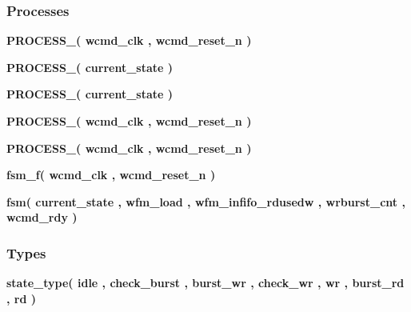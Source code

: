 \subsubsection*{Processes}
 \begin{DoxyCompactItemize}
\item 
{\bf P\+R\+O\+C\+E\+S\+S\+\_}{\bfseries  ( {\bfseries {\bfseries {\bf wcmd\+\_\+clk}} \textcolor{vhdlchar}{ }} , {\bfseries {\bfseries {\bf wcmd\+\_\+reset\+\_\+n}} \textcolor{vhdlchar}{ }} )}
\item 
{\bf P\+R\+O\+C\+E\+S\+S\+\_}{\bfseries  ( {\bfseries {\bfseries {\bf current\+\_\+state}} \textcolor{vhdlchar}{ }} )}
\item 
{\bf P\+R\+O\+C\+E\+S\+S\+\_}{\bfseries  ( {\bfseries {\bfseries {\bf current\+\_\+state}} \textcolor{vhdlchar}{ }} )}
\item 
{\bf P\+R\+O\+C\+E\+S\+S\+\_}{\bfseries  ( {\bfseries {\bfseries {\bf wcmd\+\_\+clk}} \textcolor{vhdlchar}{ }} , {\bfseries {\bfseries {\bf wcmd\+\_\+reset\+\_\+n}} \textcolor{vhdlchar}{ }} )}
\item 
{\bf P\+R\+O\+C\+E\+S\+S\+\_}{\bfseries  ( {\bfseries {\bfseries {\bf wcmd\+\_\+clk}} \textcolor{vhdlchar}{ }} , {\bfseries {\bfseries {\bf wcmd\+\_\+reset\+\_\+n}} \textcolor{vhdlchar}{ }} )}
\item 
{\bf fsm\+\_\+f}{\bfseries  ( {\bfseries {\bfseries {\bf wcmd\+\_\+clk}} \textcolor{vhdlchar}{ }} , {\bfseries {\bfseries {\bf wcmd\+\_\+reset\+\_\+n}} \textcolor{vhdlchar}{ }} )}
\item 
{\bf fsm}{\bfseries  ( {\bfseries {\bfseries {\bf current\+\_\+state}} \textcolor{vhdlchar}{ }} , {\bfseries {\bfseries {\bf wfm\+\_\+load}} \textcolor{vhdlchar}{ }} , {\bfseries {\bfseries {\bf wfm\+\_\+infifo\+\_\+rdusedw}} \textcolor{vhdlchar}{ }} , {\bfseries {\bfseries {\bf wrburst\+\_\+cnt}} \textcolor{vhdlchar}{ }} , {\bfseries {\bfseries {\bf wcmd\+\_\+rdy}} \textcolor{vhdlchar}{ }} )}
\end{DoxyCompactItemize}
\subsubsection*{Types}
 \begin{DoxyCompactItemize}
\item 
{\bfseries {\bf state\+\_\+type}{\bfseries \textcolor{vhdlchar}{(}\textcolor{vhdlchar}{ }\textcolor{vhdlchar}{idle}\textcolor{vhdlchar}{ }\textcolor{vhdlchar}{,}\textcolor{vhdlchar}{ }\textcolor{vhdlchar}{check\+\_\+burst}\textcolor{vhdlchar}{ }\textcolor{vhdlchar}{,}\textcolor{vhdlchar}{ }\textcolor{vhdlchar}{burst\+\_\+wr}\textcolor{vhdlchar}{ }\textcolor{vhdlchar}{,}\textcolor{vhdlchar}{ }\textcolor{vhdlchar}{check\+\_\+wr}\textcolor{vhdlchar}{ }\textcolor{vhdlchar}{,}\textcolor{vhdlchar}{ }\textcolor{vhdlchar}{wr}\textcolor{vhdlchar}{ }\textcolor{vhdlchar}{,}\textcolor{vhdlchar}{ }\textcolor{vhdlchar}{burst\+\_\+rd}\textcolor{vhdlchar}{ }\textcolor{vhdlchar}{,}\textcolor{vhdlchar}{ }\textcolor{vhdlchar}{rd}\textcolor{vhdlchar}{ }\textcolor{vhdlchar}{)}\textcolor{vhdlchar}{ }}} 
\end{DoxyCompactItemize}
